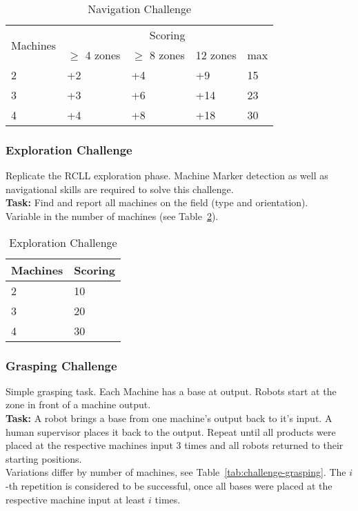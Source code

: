 \documentclass[12pt,twoside]{article}
\newcommand{\reftab}[1]{Table~\ref{#1}}
\begin{document}
\begin{table}[!htb]
 \centering
 \begin{tabular}{l|l|l|l|l}
  \multirow{2}{*}{Machines}
  & \multicolumn{4}{c}{Scoring} \\\cline{2-5}
	& $\geq$ 4 zones  & $\geq$ 8 zones & 12 zones  & max \\\hline\hline
	 2 & +2 & +4 & +9 & 15 \\
	 3 & +3 & +6 & +14 & 23 \\
	 4 & +4 & +8 & +18 & 30 \\
 \end{tabular}
 \caption{Navigation Challenge}
 \label{tab:challenge-navigation}
\end{table}

\subsubsection{Exploration Challenge}\label{sec:challenge-exploration}
Replicate the RCLL exploration phase.
Machine Marker detection as well as navigational skills are required to solve
this challenge.\\
\textbf{Task:} Find and report all machines on the field (type and orientation).
\\
Variable in the number of machines
(see \reftab{tab:challenge-exploration}).
\begin{table}[!htb]
 \centering
 \begin{tabular}{l|l}
  Machines & Scoring \\\hline
  2   & 10 \\
  3   & 20 \\
  4   & 30 \\
 \end{tabular}
 \caption{Exploration Challenge}
 \label{tab:challenge-exploration}
\end{table}

\subsubsection{Grasping Challenge}\label{sec:challenge-grasping}
Simple grasping task.
Each Machine has a base at output.
Robots start at the zone in front of a machine output.\\
\textbf{Task:} A robot brings a base from one machine's output back to it's
input. A human supervisor places it back to the output. Repeat until all
products were placed at the respective machines input 3 times and all robots
returned to their starting positions. \\
Variations differ by number of machines, see
\reftab{tab:challenge-grasping}. The $i$-th repetition is considered to be
successful, once all bases were placed at the respective machine input
at least $i$ times.
\end{document}
